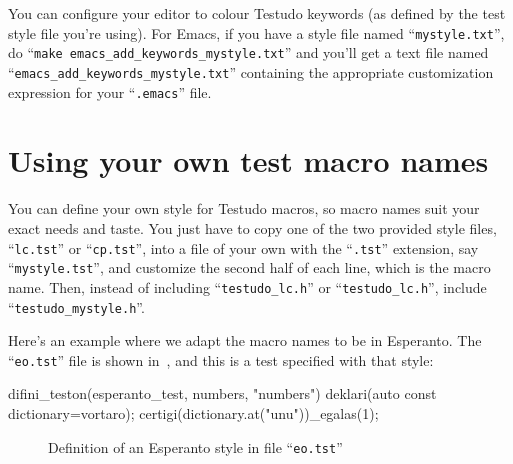 \documentclass[twoside, a4paper, article]{memoir}
\begin{document}
You can configure your editor to colour Testudo keywords (as defined by the
test style file you're using).  For Emacs, if you have a style file named
``\texttt{mystyle.txt}'', do ``\texttt{make
  emacs\_add\_keywords\_mystyle.txt}'' and you'll get a text file named
``\texttt{emacs\_add\_keywords\_mystyle.txt}'' containing the appropriate
customization expression for your ``\texttt{.emacs}'' file.


\chapter{Using your own test macro names}
\label{cha:using-your-own-test-macro-names}

You can define your own style for Testudo macros, so macro names suit your
exact needs and taste.  You just have to copy one of the two provided style
files, ``\texttt{lc.tst}'' or ``\texttt{cp.tst}'', into a file of your own with
the ``\texttt{.tst}'' extension, say ``\texttt{mystyle.tst}'', and customize
the second half of each line, which is the macro name.  Then, instead of
including ``\texttt{testudo\_lc.h}'' or ``\texttt{testudo\_lc.h}'', include
``\texttt{testudo\_mystyle.h}''.

Here's an example where we adapt the macro names to be in Esperanto.  The
``\texttt{eo.tst}'' file is shown in~, and this is a
test specified with that style:
\begin{cpplisting}
difini_teston(esperanto_test, numbers, "numbers") {
  deklari(auto const dictionary=vortaro);
  certigi(dictionary.at("unu"))_egalas(1);
}
\end{cpplisting}

\begin{figure}
  \centering
  \caption{Definition of an Esperanto style in file ``\texttt{eo.tst}''}
  \label{fig:esperanto-style}
\end{figure}

\backmatter
\end{document}
